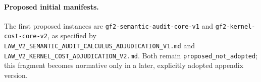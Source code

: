 \paragraph{Proposed initial manifests.}
The first proposed instances are
\texttt{gf2-semantic-audit-core-v1} and
\texttt{gf2-kernel-cost-core-v2}, as specified by
\texttt{LAW\_V2\_SEMANTIC\_AUDIT\_CALCULUS\_ADJUDICATION\_V1.md} and
\texttt{LAW\_V2\_KERNEL\_COST\_ADJUDICATION\_V2.md}.  Both remain
\texttt{proposed\_not\_adopted}; this fragment becomes normative only in a
later, explicitly adopted appendix version.
